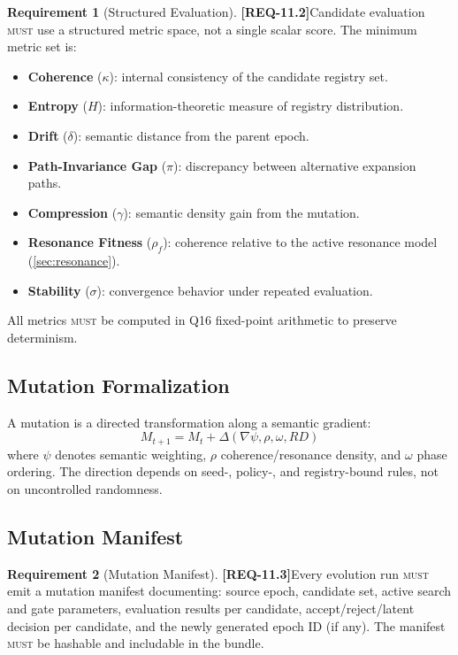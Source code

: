 \documentclass[11pt,a4paper,twoside]{article}
\theoremstyle{definition}
\newtheorem{requirement}{Requirement}[section]
\theoremstyle{remark}
\newcommand{\req}[1]{\textbf{\textcolor{reqred}{[REQ-#1]}}}
\newcommand{\must}{\textsc{must}}
\begin{document}
\begin{requirement}[Structured Evaluation]
\label{req:eval-metrics}
\req{11.2}\quad Candidate evaluation \must{} use a structured metric space, not a single scalar score. The minimum metric set is:
\begin{itemize}[nosep]
  \item \textbf{Coherence} ($\kappa$): internal consistency of the candidate registry set.
  \item \textbf{Entropy} ($H$): information-theoretic measure of registry distribution.
  \item \textbf{Drift} ($\delta$): semantic distance from the parent epoch.
  \item \textbf{Path-Invariance Gap} ($\pi$): discrepancy between alternative expansion paths.
  \item \textbf{Compression} ($\gamma$): semantic density gain from the mutation.
  \item \textbf{Resonance Fitness} ($\rho_f$): coherence relative to the active resonance model (\cref{sec:resonance}).
  \item \textbf{Stability} ($\sigma$): convergence behavior under repeated evaluation.
\end{itemize}
All metrics \must{} be computed in Q16 fixed-point arithmetic to preserve determinism.
\end{requirement}

\subsection{Mutation Formalization}

A mutation is a directed transformation along a semantic gradient:
\[
  M_{t+1} = M_t + \Delta(\nabla\psi, \rho, \omega, \mathit{RD})
\]
where $\psi$ denotes semantic weighting, $\rho$ coherence/resonance density, and $\omega$ phase ordering. The direction depends on seed-, policy-, and registry-bound rules, not on uncontrolled randomness.

\subsection{Mutation Manifest}

\begin{requirement}[Mutation Manifest]
\label{req:mutation-manifest}
\req{11.3}\quad Every evolution run \must{} emit a mutation manifest documenting: source epoch, candidate set, active search and gate parameters, evaluation results per candidate, accept/reject/latent decision per candidate, and the newly generated epoch ID (if any). The manifest \must{} be hashable and includable in the bundle.
\end{requirement}
\end{document}
